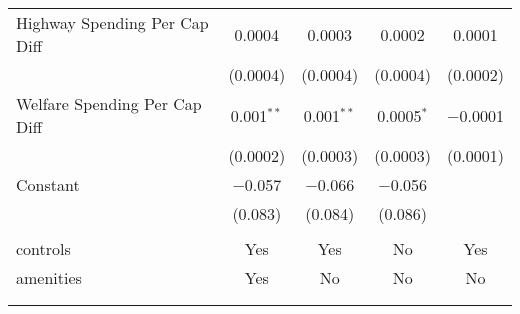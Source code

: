 \begin{table}[!htbp]
\begin{tabular}{@{\extracolsep{5pt}}lcccc}
  Highway Spending Per Cap Diff & 0.0004 & 0.0003 & 0.0002 & 0.0001 \\ 
  & (0.0004) & (0.0004) & (0.0004) & (0.0002) \\ 
  Welfare Spending Per Cap Diff & 0.001$^{**}$ & 0.001$^{**}$ & 0.0005$^{*}$ & $-$0.0001 \\ 
  & (0.0002) & (0.0003) & (0.0003) & (0.0001) \\ 
  Constant & $-$0.057 & $-$0.066 & $-$0.056 &  \\ 
  & (0.083) & (0.084) & (0.086) &  \\ 
 \hline \\[-1.8ex] 
controls & Yes & Yes & No & Yes \\ 
amenities & Yes & No & No & No \\ 
\hline \\[-1.8ex] 
\hline 
\hline \\[-1.8ex] 
\end{tabular} 
\end{table} 
